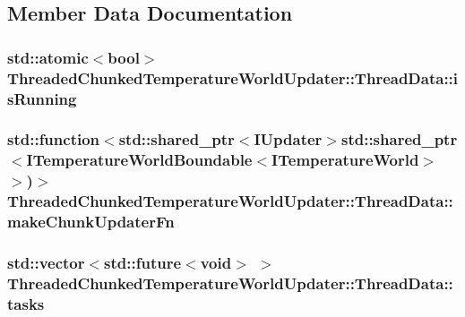 \subsection{Member Data Documentation}
\hypertarget{struct_threaded_chunked_temperature_world_updater_1_1_thread_data_a1c567a74e2d30e04a7b904697f5bc32d}{
\subsubsection[{is\-Running}]{\setlength{\rightskip}{0pt plus 5cm}std\-::atomic$<$bool$>$ Threaded\-Chunked\-Temperature\-World\-Updater\-::\-Thread\-Data\-::is\-Running}}\label{struct_threaded_chunked_temperature_world_updater_1_1_thread_data_a1c567a74e2d30e04a7b904697f5bc32d}
\hypertarget{struct_threaded_chunked_temperature_world_updater_1_1_thread_data_aebe35eda756d6db5245a142e483f7a98}{
\subsubsection[{make\-Chunk\-Updater\-Fn}]{\setlength{\rightskip}{0pt plus 5cm}std\-::function$<$std\-::shared\-\_\-ptr$<${\bf I\-Updater}$>$std\-::shared\-\_\-ptr$<${\bf I\-Temperature\-World\-Boundable}$<${\bf I\-Temperature\-World}$>$ $>$)$>$ Threaded\-Chunked\-Temperature\-World\-Updater\-::\-Thread\-Data\-::make\-Chunk\-Updater\-Fn}}\label{struct_threaded_chunked_temperature_world_updater_1_1_thread_data_aebe35eda756d6db5245a142e483f7a98}
\hypertarget{struct_threaded_chunked_temperature_world_updater_1_1_thread_data_ab084ac0c15a2536095bef8c9297361f5}{
\subsubsection[{tasks}]{\setlength{\rightskip}{0pt plus 5cm}std\-::vector$<$std\-::future$<$void$>$ $>$ Threaded\-Chunked\-Temperature\-World\-Updater\-::\-Thread\-Data\-::tasks}}\label{struct_threaded_chunked_temperature_world_updater_1_1_thread_data_ab084ac0c15a2536095bef8c9297361f5}
